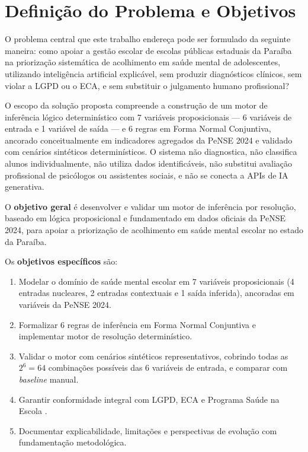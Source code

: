 \documentclass[
    12pt,
    openright,
    oneside,
    a4paper,
    english,
    brazil
]{abntex2}
\begin{document}
\chapter{Defini\c{c}\~ao do Problema e Objetivos}

O problema central que este trabalho endere\c{c}a pode ser formulado da seguinte maneira: como apoiar a gest\~ao escolar de escolas p\'ublicas estaduais da Para\'iba na prioriza\c{c}\~ao sistem\'atica de acolhimento em sa\'ude mental de adolescentes, utilizando intelig\^encia artificial explic\'avel, sem produzir diagn\'osticos cl\'inicos, sem violar a LGPD ou o ECA, e sem substituir o julgamento humano profissional?

O escopo da solu\c{c}\~ao proposta compreende a constru\c{c}\~ao de um motor de infer\^encia l\'ogico determin\'istico com 7 vari\'aveis proposicionais --- 6 vari\'aveis de entrada e 1 vari\'avel de sa\'ida --- e 6 regras em Forma Normal Conjuntiva, ancorado conceitualmente em indicadores agregados da PeNSE 2024 e validado com cen\'arios sint\'eticos determin\'isticos. O sistema n\~ao diagnostica, n\~ao classifica alunos individualmente, n\~ao utiliza dados identific\'aveis, n\~ao substitui avalia\c{c}\~ao profissional de psic\'ologos ou assistentes sociais, e n\~ao se conecta a APIs de IA generativa.

O \textbf{objetivo geral} \'e desenvolver e validar um motor de infer\^encia por resolu\c{c}\~ao, baseado em l\'ogica proposicional e fundamentado em dados oficiais da PeNSE 2024, para apoiar a prioriza\c{c}\~ao de acolhimento em sa\'ude mental escolar no estado da Para\'iba.

Os \textbf{objetivos espec\'ificos} s\~ao:

\begin{enumerate}
    \item Modelar o dom\'inio de sa\'ude mental escolar em 7 vari\'aveis proposicionais (4 entradas nucleares, 2 entradas contextuais e 1 sa\'ida inferida), ancoradas em vari\'aveis da PeNSE 2024.
    \item Formalizar 6 regras de infer\^encia em Forma Normal Conjuntiva e implementar motor de resolu\c{c}\~ao determin\'istico.
    \item Validar o motor com cen\'arios sint\'eticos representativos, cobrindo todas as $2^6 = 64$ combina\c{c}\~oes poss\'iveis das 6 vari\'aveis de entrada, e comparar com \textit{baseline} manual.
    \item Garantir conformidade integral com LGPD, ECA e Programa Sa\'ude na Escola \cite{brasil_pse_2007}.
    \item Documentar explicabilidade, limita\c{c}\~oes e perspectivas de evolu\c{c}\~ao com fundamenta\c{c}\~ao metodol\'ogica.
\end{enumerate}
\end{document}
